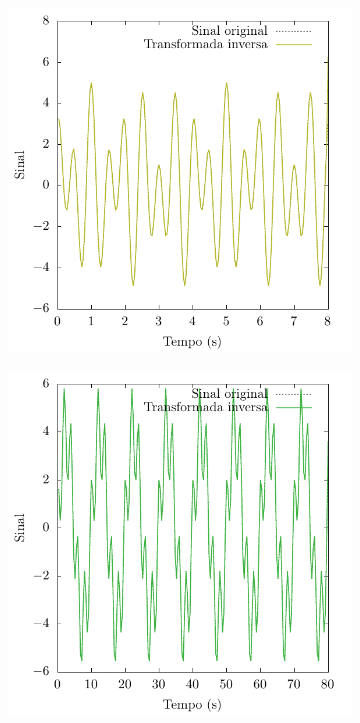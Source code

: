 \documentclass[a4paper, 11pt]{article}
\begin{document}
\begin{figure}[h!]
    \centering
    \begin{subfigure}{0.40\textwidth}
        \centering
        \includegraphics[width=\textwidth]{inv-dft-B}
    \end{subfigure}
    \hfill
    \begin{subfigure}{0.40\textwidth}
        \centering
        \includegraphics[width=\textwidth]{inv-dft-C}

\end{subfigure}
\end{figure}
\end{document}
